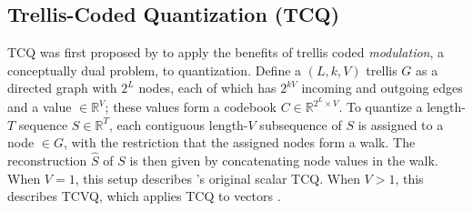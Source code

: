 



\subsection{Trellis-Coded Quantization (TCQ)}

TCQ was first proposed by \citet{46532} to apply the benefits of trellis coded \textit{modulation}, a conceptually dual problem, to quantization.
Define a $(L, k, V)$ trellis $G$ as a directed graph with $2^L$ nodes, each of which has $2^{kV}$ incoming and outgoing edges and a value $\in \mathbb{R}^V$; these values form a codebook $C \in \mathbb{R}^{2^L\times V}$.
To quantize a length-$T$ sequence $S \in \mathbb{R}^T$, each contiguous length-$V$ subsequence of $S$ is assigned to a node $\in G$, with the restriction that the assigned nodes form a walk.
The reconstruction $\hat S$ of $S$ is then given by concatenating node values in the walk.
When $V = 1$, this setup describes \citet{46532}'s original scalar TCQ.
When $V > 1$, this describes TCVQ, which applies TCQ to vectors \cite{104316,156629}.

